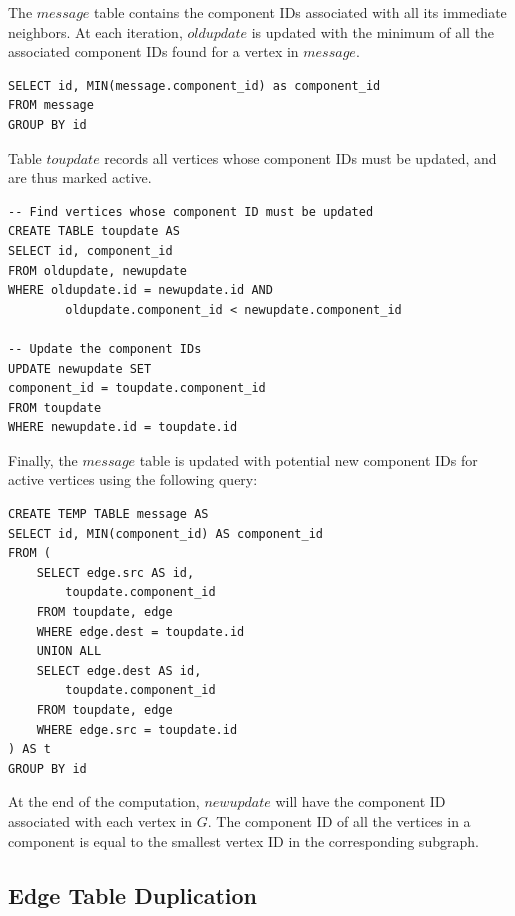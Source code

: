 The $message$ table contains the component IDs associated with all its
immediate neighbors. At each iteration, $oldupdate$ is updated with the
minimum of all the associated component IDs found for a vertex in $message$.

\begin{algorithm}
\begin{lstlisting}
SELECT id, MIN(message.component_id) as component_id
FROM message
GROUP BY id
\end{lstlisting}
\end{algorithm}

Table $toupdate$ records all vertices whose component IDs must be updated,
and are thus marked active.

\begin{algorithm}
\begin{lstlisting}
-- Find vertices whose component ID must be updated
CREATE TABLE toupdate AS
SELECT id, component_id
FROM oldupdate, newupdate
WHERE oldupdate.id = newupdate.id AND
        oldupdate.component_id < newupdate.component_id

-- Update the component IDs
UPDATE newupdate SET
component_id = toupdate.component_id
FROM toupdate
WHERE newupdate.id = toupdate.id
\end{lstlisting}
\end{algorithm}

Finally, the $message$ table is updated with potential new
component IDs for active vertices using the following query:

\begin{algorithm} \label{wcc:message}
\begin{lstlisting}
CREATE TEMP TABLE message AS
SELECT id, MIN(component_id) AS component_id
FROM (
    SELECT edge.src AS id,
        toupdate.component_id
    FROM toupdate, edge
    WHERE edge.dest = toupdate.id
    UNION ALL
    SELECT edge.dest AS id,
        toupdate.component_id
    FROM toupdate, edge
    WHERE edge.src = toupdate.id
) AS t
GROUP BY id
\end{lstlisting}
\end{algorithm}

At the end of the computation, $newupdate$ will have the component ID
associated with each vertex in $G$. The component ID of all the vertices
in a component is equal to the smallest vertex ID in the corresponding
subgraph.

\subsection{Edge Table Duplication} \label{sec:wcc:duplication}

